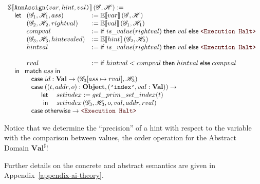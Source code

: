 \[\begin{array}{l}
    \Ctx{S}{\SLit{AnnAssign}{var, hint, val}}\left(\Glo, \Hea\right) := \\
    \quad \letm
       \begin{array}[t]{ll}
          \left(\Glo_1, \Hea_1, ass\right) &:= \Ctx{E}{var}\left(\Glo, \Hea\right) \\
          \left(\Glo_2, \Hea_2, rightval\right) &:= \Ctx{E}{val}\left(\Glo_1, \Hea_1\right) \\
          compval &:= \ifm is\_value(rightval) \;\thenm val \;\elsem \Halt \\
          \left(\Glo_3, \Hea_3, hintevaled\right) &:= \Ctx{E}{hint}\left(\Glo_2, \Hea_2\right) \\
          hintval &:= \ifm is\_value(rightval) \;\thenm val \;\elsem \Halt \\
          \\
          rval &:= \ifm hintval < compval \;\thenm hintval \;\elsem compval \\
       \end{array} \\
    \quad \inm
      \begin{array}[t]{l}
       \matchm{ass} \\
       \quad \casem{id: \mathbf{Val}} \to \left(\Glo_3[ass \mapsto rval], \Hea_3\right) \\
       \quad \casem{((t, addr, o): \mathbf{Object}, (\texttt{'index'}, val: \mathbf{Val}))} \to \\
       \quad\quad\begin{array}[t]{rl}
               \letm& setindex := get\_prim\_set\_index(t) \\
                \inm& setindex\left(\Glo_3, \Hea_3, o, val, addr, rval\right) \\
       \end{array} \\
       \quad \casem{\textsf{otherwise}} \to \Halt \\
      \end{array} \\
  \end{array}\]

%

Notice that we determine the \enquote{precision} of a hint with respect to the variable
with the comparison between values, the order operation for the Abstract Domain
\(\mathbf{Val}^\sharp\)!

Further details on the concrete and abstract semantics are given in
Appendix~\ref{appendix-ai-theory}.
